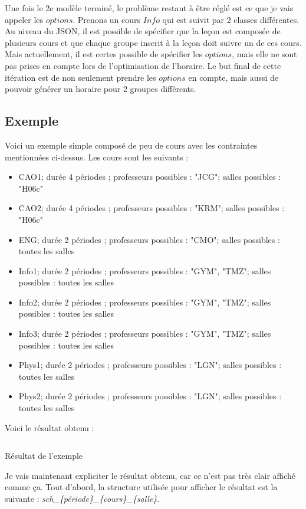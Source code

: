 Une fois le 2e modèle terminé, le problème restant à être réglé est ce que je vais appeler les $options$. Prenons un cours $Info$ qui est suivit par 2 classes différentes. Au niveau du JSON, il est possible de spécifier que la leçon est composée de plusieurs cours et que chaque groupe inscrit à la leçon doit suivre un de ces cours. Mais actuellement, il est certes possible de spécifier les $options$, mais elle ne sont pas prises en compte lors de l'optimisation de l'horaire. Le but final de cette itération est de non seulement prendre les $options$ en compte, mais aussi de pouvoir générer un horaire pour 2 groupes différents.

\subsection{Exemple}
Voici un exemple simple composé de peu de cours avec les contraintes mentionnées ci-dessus. Les cours sont les suivants :
\begin{itemize}
\item CAO1; durée 4 périodes ; professeurs possibles : "JCG"; salles possibles : "H06c"
\item CAO2; durée 4 périodes ; professeurs possibles : "KRM"; salles possibles : "H06c"
\item ENG; durée 2 périodes ; professeurs possibles : "CMO"; salles possibles : toutes les salles
\item Info1; durée 2 périodes ; professeurs possibles : "GYM", "TMZ"; salles possibles : toutes les salles
\item Info2; durée 2 périodes ; professeurs possibles : "GYM", "TMZ"; salles possibles : toutes les salles
\item Info3; durée 2 périodes ; professeurs possibles : "GYM", "TMZ"; salles possibles : toutes les salles
\item Phys1; durée 2 périodes ; professeurs possibles : "LGN"; salles possibles : toutes les salles
\item Phys2; durée 2 périodes ; professeurs possibles : "LGN"; salles possibles : toutes les salles
\end{itemize}

Voici le résultat obtenu :

\begin{listing}[H]
\inputminted{java}{assets/figures/solutions.txt}
\caption{Résultat de l'exemple}
\end{listing}

Je vais maintenant expliciter le résultat obtenu, car ce n'est pas très clair affiché comme ça. Tout d'abord, la structure utilisée pour afficher le résultat est la suivante : \textit{sch\_\{période\}\_\{cours\}\_\{salle\}}.


